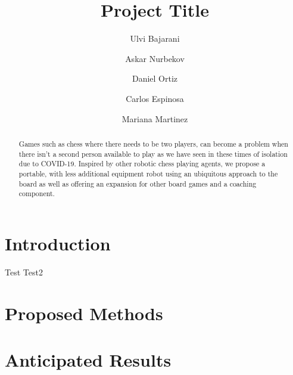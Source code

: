 \documentclass[manuscript]{style}
\begin{document}
\title{Project Title}


\author{Ulvi Bajarani}

\author{Askar Nurbekov}

\author{Daniel Ortiz}

\author{Carlos Espinosa}

\author{Mariana Martinez}


\renewcommand{\shortauthors}{U. Bajarani, A. Nurbekov, D. Ortiz, C. Espinosa \& M. Martinez}


\begin{abstract}
Games such as chess where there needs to be two players, can become a problem when there isn’t a second person available to play as we have seen in these times of isolation due to COVID-19. Inspired by other robotic chess playing agents, we propose a portable, with less additional equipment robot using an ubiquitous approach to the board as well as offering an expansion for other board games and a coaching component.
\end{abstract}




\maketitle


\section*{Introduction}

Test \cite{chen2019robust} Test2 \cite{rath2019autonomous}

\section*{Proposed Methods}



\section*{Anticipated Results}




\printbibliography
\end{document}
